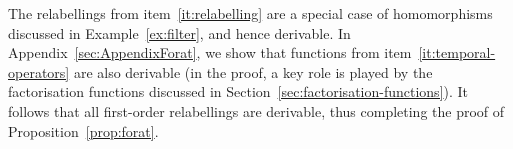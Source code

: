The relabellings from item~\ref{it:relabelling} are   a special case of homomorphisms discussed in Example~\ref{ex:filter}, and hence derivable. In Appendix~\ref{sec:AppendixForat}, we show that functions from item~\ref{it:temporal-operators} are also derivable (in the proof, a key role is played by the factorisation functions discussed in Section~\ref{sec:factorisation-functions}). It follows that all first-order relabellings are derivable, thus  completing the proof of  Proposition~\ref{prop:forat}.
